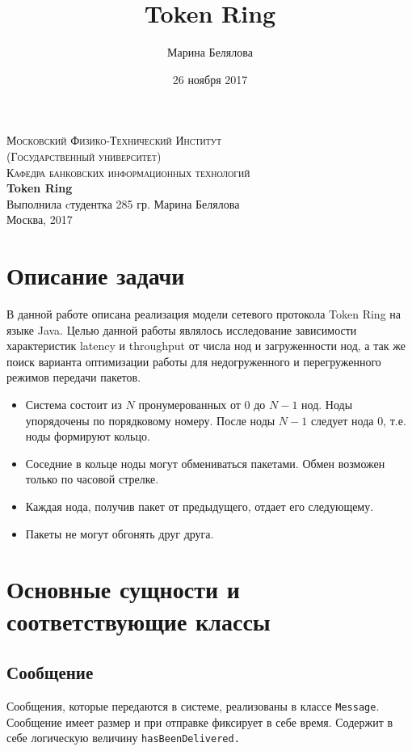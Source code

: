\documentclass[12pt]{article}
\title{Token Ring}
\author{Марина Белялова}
\date{26 ноября 2017}
\begin{document}
\begin{center}


\textsc{\Large Московский Физико-Технический Институт \\ (Государственный университет)}\\[1cm]
\textsc{\normalsize Кафедра банковских информационных технологий}\\[4cm]
{ \huge \bfseries Token Ring \\[1cm] }
\textnormal{\normalsize Выполнила cтудентка 285 гр. Марина Белялова}\\[10cm]
\textnormal{Москва, 2017}
\end{center}


\newpage

\tableofcontents

\newpage
\section{Описание задачи}
В данной работе описана реализация модели сетевого протокола Token Ring на языке Java. Целью данной работы являлось исследование зависимости характеристик latency и throughput от числа нод и загруженности нод, а так же поиск варианта оптимизации работы для недогруженного и перегруженного режимов передачи пакетов.

\begin{itemize}
\item Система состоит из $N$ пронумерованных от $0$ до $N-1$ нод. Ноды упорядочены по порядковому номеру. После ноды $N-1$ следует нода $0$, т.е. ноды формируют кольцо. 
\item Соседние в кольце ноды могут обмениваться пакетами. Обмен возможен только по часовой стрелке. 
\item Каждая нода, получив пакет от предыдущего, отдает его следующему.
\item Пакеты не могут обгонять друг друга.
\end{itemize}

\section{Основные сущности и соответствующие классы}
\subsection{Сообщение}
Сообщения, которые передаются в системе, реализованы в классе \lstinline|Message|. Сообщение имеет размер и при отправке фиксирует в себе время. Содержит в себе логическую величину
\lstinline|hasBeenDelivered.|
\end{document}
